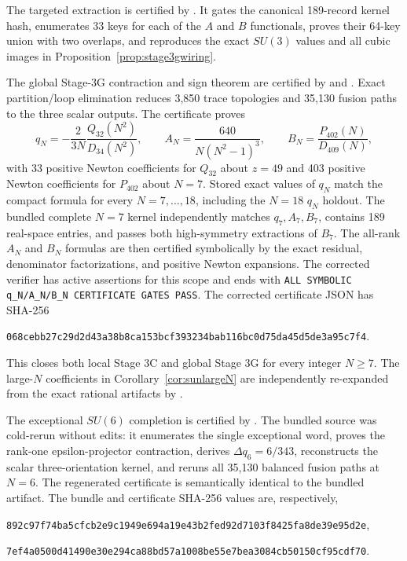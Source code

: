 \documentclass[11pt]{article}
\begin{document}
The targeted extraction is certified by
. It gates the canonical
189-record kernel hash, enumerates 33 keys for each of the $A$ and $B$
functionals, proves their 64-key union with two overlaps, and reproduces the
exact $SU(3)$ values and all cubic images in
Proposition~\ref{prop:stage3gwiring}.

The global Stage-3G contraction and sign theorem are certified by
 and
. Exact partition/loop elimination reduces
3,850 trace topologies and 35,130 fusion paths to the three scalar outputs.
The certificate proves
\[
q_N=-\frac{2}{3N}\frac{Q_{32}(N^2)}{D_{34}(N^2)},\qquad
A_N=\frac{640}{N(N^2-1)^3},\qquad
B_N=\frac{P_{402}(N)}{D_{409}(N)},
\]
with 33 positive Newton coefficients for $Q_{32}$ about $z=49$ and 403
positive Newton coefficients for $P_{402}$ about $N=7$. Stored exact values
of $q_N$ match the compact formula for every $N=7,\ldots,18$, including the
$N=18$ $q_N$ holdout. The bundled complete $N=7$ kernel independently
matches $q_7,A_7,B_7$, contains 189 real-space entries, and passes both
high-symmetry extractions of $B_7$. The all-rank $A_N$ and $B_N$ formulas are
then certified symbolically by the exact residual, denominator
factorizations, and positive Newton expansions. The corrected verifier has
active assertions for this scope and ends with
\texttt{ALL SYMBOLIC q\_N/A\_N/B\_N CERTIFICATE GATES PASS}. The corrected
certificate JSON has SHA-256
\begin{center}
\texttt{068cebb27c29d2d43a38b8ca153bcf393234bab116bc0d75da45d5de3a95c7f4}.
\end{center}
This closes both local Stage 3C and global Stage 3G for every integer
$N\geq7$. The large-$N$ coefficients in
Corollary~\ref{cor:sunlargeN} are independently re-expanded from the exact
rational artifacts by .


The exceptional $SU(6)$ completion is certified by
. The bundled source was cold-rerun
without edits: it enumerates the single exceptional word, proves the rank-one
epsilon-projector contraction, derives $\Delta q_6=6/343$, reconstructs the
scalar three-orientation kernel, and reruns all 35,130 balanced fusion paths at
$N=6$. The regenerated certificate is semantically identical to the bundled
artifact. The bundle and certificate SHA-256 values are, respectively,
\begin{center}
\texttt{892c97f74ba5cfcb2e9c1949e694a19e43b2fed92d7103f8425fa8de39e95d2e},
\end{center}
\begin{center}
\texttt{7ef4a0500d41490e30e294ca88bd57a1008be55e7bea3084cb50150cf95cdf70}.
\end{center}
\end{document}
